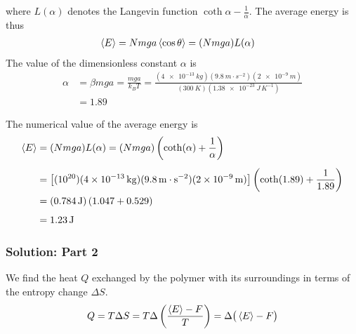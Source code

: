 \documentclass[11pt, a4paper]{article}
\begin{document}
where $ L(\alpha) $ denotes the Langevin function $ \coth \alpha - \frac{1}{\alpha} $.
The average energy is thus
\begin{align*}
	\expval{E} &= N m g a \expval{\cos \theta} = (N mga )L(\alpha)
\end{align*}
The value of the dimensionless constant $ \alpha $ is
\begin{align*}
	\alpha &= \beta m g a = \frac{mga}{k_B T} = \frac{(\SI{4e-13}{kg}) (\SI{9.8}{m \cdot s^{-2}}) (\SI{2e-9}{m})}{(\SI{300}{K}) (\SI{1.38e-23}{J \, K^{-1}})}\\ &= 1.89
\end{align*}

The numerical value of the average energy is
\begin{align*}
	\expval{E} &= (N mga )L(\alpha) = (N m g a ) \left(\coth(\alpha) + \frac{1}{\alpha} \right) \\[1.0ex]
	&= \left[(10^{20}) (\SI{4e-13}{kg}) (\SI{9.8}{m \cdot s^{-2}}) (\SI{2e-9}{m} ) \right] \left(\coth(1.89) + \frac{1}{1.89} \right)\\
	&=(\SI{0.784}{J})\left(1.047 + 0.529 \right)\\[1.0ex]
	& = \SI{1.23}{J}
\end{align*}


\subsubsection*{Solution: Part 2}
We find the heat $ Q $ exchanged by the polymer with its surroundings in terms of the entropy change $ \Delta S $.
\begin{align*}
	Q = T \Delta S = T \Delta \left(\frac{\expval{E} - F}{T} \right) = \Delta \big (\expval{E} - F \big )
\end{align*}
\end{document}
